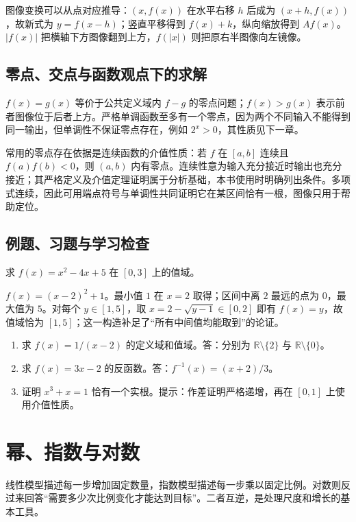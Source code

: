 \documentclass[UTF8]{ctexbook}
\begin{document}
图像变换可以从点对应推导：$(x,f(x))$ 在水平右移 $h$ 后成为 $(x+h,f(x))$，故新式为 $y=f(x-h)$；竖直平移得到 $f(x)+k$，纵向缩放得到 $Af(x)$。$|f(x)|$ 把横轴下方图像翻到上方，$f(|x|)$ 则把原右半图像向左镜像。

\section{零点、交点与函数观点下的求解}
$f(x)=g(x)$ 等价于公共定义域内 $f-g$ 的零点问题；$f(x)>g(x)$ 表示前者图像位于后者上方。严格单调函数至多有一个零点，因为两个不同输入不能得到同一输出，但单调性不保证零点存在，例如 $2^x>0$，其性质见下一章。

常用的零点存在依据是连续函数的介值性质：若 $f$ 在 $[a,b]$ 连续且 $f(a)f(b)<0$，则 $(a,b)$ 内有零点。连续性意为输入充分接近时输出也充分接近；其严格定义及介值定理证明属于分析基础，本书使用时明确列出条件。多项式连续，因此可用端点符号与单调性共同证明它在某区间恰有一根，图像只用于帮助定位。

\section{例题、习题与学习检查}
\begin{example}
求 $f(x)=x^2-4x+5$ 在 $[0,3]$ 上的值域。
\end{example}
\begin{solve}
$f(x)=(x-2)^2+1$。最小值 $1$ 在 $x=2$ 取得；区间中离 $2$ 最远的点为 $0$，最大值为 $5$。对每个 $y\in[1,5]$，取 $x=2-\sqrt{y-1}\in[0,2]$ 即有 $f(x)=y$，故值域恰为 $[1,5]$；这一构造补足了“所有中间值均能取到”的论证。
\end{solve}
\begin{enumerate}
\item 求 $f(x)=1/(x-2)$ 的定义域和值域。答：分别为 $\mathbb R\setminus\{2\}$ 与 $\mathbb R\setminus\{0\}$。
\item 求 $f(x)=3x-2$ 的反函数。答：$f^{-1}(x)=(x+2)/3$。
\item 证明 $x^3+x=1$ 恰有一个实根。提示：作差证明严格递增，再在 $[0,1]$ 上使用介值性质。
\end{enumerate}

\chapter{幂、指数与对数}
\label{chap:em-exponential}
线性模型描述每一步增加固定数量，指数模型描述每一步乘以固定比例。对数则反过来回答“需要多少次比例变化才能达到目标”。二者互逆，是处理尺度和增长的基本工具。
\end{document}
